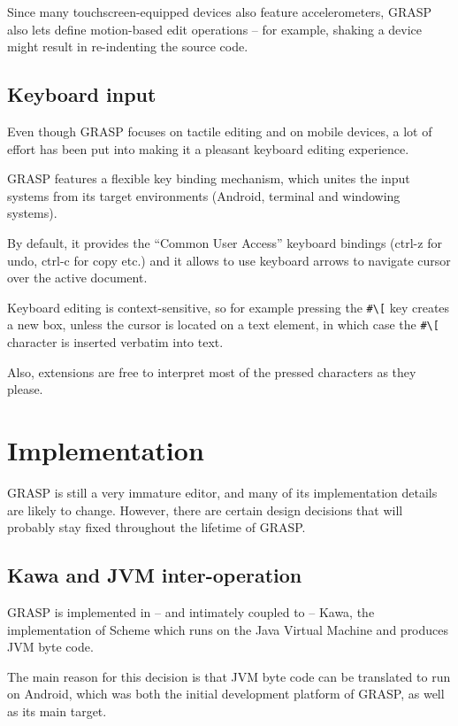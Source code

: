 \documentclass[sigconf]{acmart}
\begin{document}
Since many touchscreen-equipped devices also
feature accelerometers, GRASP also lets define
motion-based edit operations -- for example, shaking
a device might result in re-indenting the source
code.

\subsection{Keyboard input}

Even though GRASP focuses on tactile editing
and on mobile devices, a lot of effort has been
put into making it a pleasant keyboard editing
experience.

GRASP features a flexible key binding mechanism,
which unites the input systems from its target
environments (Android, terminal and windowing
systems).

By default, it provides the ``Common User Access''
keyboard bindings (ctrl-z for undo, ctrl-c for copy
etc.) and it allows to use keyboard arrows to
navigate cursor over the active document.

Keyboard editing is context-sensitive, so
for example pressing the \texttt{\#\textbackslash[}
key creates a new box, unless the cursor is located on a text element,
in which case the \texttt{\#\textbackslash[} character is inserted verbatim
into text.

Also, extensions are free to interpret
most of the pressed characters as they please.

\section{Implementation}

GRASP is still a very immature editor, and many 
of its implementation details are likely to change. 
However, there are certain design decisions that
will probably stay fixed throughout the lifetime
of GRASP.

\subsection{Kawa and JVM inter-operation}

GRASP is implemented in -- and intimately coupled
to -- Kawa, the implementation of Scheme which runs
on the Java Virtual Machine and produces JVM byte code.

The main reason for this decision is that JVM
byte code can be translated to run on Android,
which was both the initial development platform
of GRASP, as well as its main target.
\end{document}
